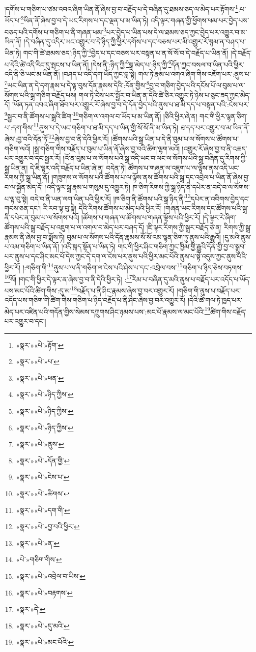 །དགོས་པ་གཅིག་པ་ཙམ་འབའ་ཞིག་ཡིན་ནོ་ཞེས་བྱ་བ་བརྗོད་པ་དེ་བཞིན་དུ་ཐམས་ཅད་ལ་མེད་པར་རྟོགས་\footnote{«སྣར་»«པེ་»རྟོག་}:པ་ཡོད་པ་\footnote{«སྣར་»«པེ་»པ་}ཡིན་ནོ་ཞེས་བྱ་བ་དེ་ཡང་རིགས་པ་དང་ལྡན་པ་མ་ཡིན་ཏེ། འདི་ལྟར་གཞན་གྱི་ཕྱོགས་ཕམ་པར་བྱེད་པས་བཅད་པའི་དགོས་པ་གཅིག་པ་ནི་གཞན་ཕམ་\footnote{«སྣར་»«པེ་»ཕན་}པར་བྱེད་པ་ཡིན་པས་དེ་ལ་ཐམས་ཅད་ཀྱང་བྱེད་པར་འགྱུར་བ་མ་ཡིན་ནོ། །དེ་བཞིན་དུ་འདིར་ཡང་འགྱུར་བ་དེ་ཉིད་ཀྱི་ཕྱིར་དགོས་པ་དང་བཅས་པར་མི་འགྱུར་རོ་སྙམ་ན་བཤད་པ་ཡིན་ཏེ། གང་གི་ཚེ་ཐམས་ཅད་:ཉིད་ཀྱི་\footnote{«སྣར་»«པེ་»ཉིད་ཀྱིས་}བྱེད་པ་དང་བཅས་པར་བསྟན་པ་ན་སོ་སོ་བ་དེ་བརྗོད་པ་ཡིན་ནོ། །དེ་བརྗོད་པ་དེའི་ཚེ་འདི་རིང་དུ་སྤངས་པ་ཡིན་ནོ། །དེས་ནི་:ཉིད་ཀྱི་\footnote{«སྣར་»«པེ་»ཉིད་ཀྱིས་}སྒྲ་མེད་པ་:ཉིད་ཀྱི་\footnote{«སྣར་»«པེ་»ཉིད་ཀྱིས་}དོན་ཀྱང་བསལ་བ་ཡིན་པའི་ཕྱིར་འདི་ནི་ཅི་ཡང་མ་ཡིན་ནོ། །བཤད་པ་འདི་དག་ཡོད་ཀྱང་བླ་སྟེ། གལ་ཏེ་རྣམ་པ་འགའ་ཞིག་གིས་འཇོག་པར་:ནུས་པ་\footnote{«སྣར་»«པེ་»ནུས་}ཡང་ཡིན་ན་དེ་དག་རྣམ་པ་དེ་ལྟ་བུས་དོན་རྣམས་དེའི་:དོན་གྱིས་\footnote{«སྣར་»«པེ་»དོན་གྱི་}བྱ་བ་གཅིག་བྱེད་པའི་དངོས་པོ་ལ་བུམ་པ་ལ་སོགས་པའི་སྒྲ་གཅིག་བརྗོད་པས། གལ་ཏེ་ངེས་པར་སྦྱོར་བ་ཡིན་ན་དེའི་ཚེ་ཅིར་འགྱུར་ཏེ་ཉེས་པ་ཅུང་ཟད་ཀྱང་མེད་དོ། །ཡོན་ཏན་འབའ་ཞིག་ཐོབ་པར་འགྱུར་རོ་ཞེས་བྱ་བ་དེ་དོན་བྱེད་པའི་ནུས་པ་ཐ་མི་དད་པ་བསྟན་པའི་:ངེས་པར་\footnote{«སྣར་»«པེ་»ངེས་པ་}སྦྱར་བ་ནི་ཚོགས་པ་སྒྲའི་ཚིག་\footnote{«སྣར་»«པེ་»ཚིགས་}གཅིག་ལ་འགལ་བ་ཡོད་པ་མ་ཡིན་ནོ། །ཅིའི་ཕྱིར་ཞེ་ན། གང་གི་ཕྱིར་ལྷན་ཅིག་པ་:དག་གིས་\footnote{«སྣར་»«པེ་»དག་གི་}ནུས་པ་དེ་ཡང་གཅིག་པ་ཐ་མི་དད་པ་ཡིན་གྱི་སོ་སོ་ནི་མ་ཡིན་ཏེ། ཐ་དད་པར་འགྱུར་བ་མ་ཡིན་ནོ་ཞེས་:བྱ་བའི་དོན་ཏོ་\footnote{«སྣར་»«པེ་»བྱ་བའི་ཕྱིར་}ཞེས་བྱ་བ་ནི་དེའི་ཕྱིར་རོ། །ཚོགས་པའི་སྒྲ་ཡིན་པ་དེ་ནི་བུམ་པ་ལ་སོགས་པ་ཚོགས་པ་གཅིག་ལའོ། །སྒྲ་གཅིག་གིས་བརྗོད་པ་བུམ་པ་ཡིན་ནོ་ཞེས་བྱ་བའི་ཚིག་ལྷག་མའོ། །འགྱུར་རོ་ཞེས་བྱ་བ་ནི་འཆད་པར་འགྱུར་བ་དང་སྦྱར་རོ། །འོ་ན་བུམ་པ་ལ་སོགས་པའི་སྒྲ་འདི་ཡང་བ་ལང་ལ་སོགས་པའི་སྒྲ་བཞིན་དུ་རིགས་ཀྱི་སྒྲ་ཡིན་ན། དེ་ཇི་ལྟར་འདི་བརྗོད་པ་ཡིན་ཞེ་ན། བདེན་ཏེ། ཚོགས་པ་གཞན་ལ་འཇུག་པ་ལ་ལྟོས་ནས་འདི་ཡང་རིགས་ཀྱི་སྒྲ་ཡིན་ནོ། །གཟུགས་ལ་སོགས་པའི་ཚོགས་པ་ལ་ལྟོས་ནས་ཚོགས་པའི་སྒྲ་དང་འབྲེལ་པ་ཡིན་ནོ་ཞེས་བྱ་བ་ལ་སྐྱོན་མེད་དོ། །འདི་ལྟར་སྒྲ་རྣམ་པ་གསུམ་དུ་འགྱུར་ཏེ། ཁ་ཅིག་རིགས་ཀྱི་སྒྲ་ཉིད་ནི་དཔེར་ན་བདེ་བ་ལ་སོགས་པ་ལྟ་བུ་སྟེ། བདེ་བ་ནི་ཡན་ལག་ཡིན་པའི་ཕྱིར་རོ། །ཁ་ཅིག་ནི་ཚོགས་པའི་སྒྲ་ཉིད་ནི་\footnote{«སྣར་»«པེ་»ན་}དཔེར་ན་འབིགས་བྱེད་དང་གངས་ཅན་དང་། རི་རབ་ལྟ་བུ་སྟེ། དེའི་རིགས་ཚོགས་པ་མེད་པའི་ཕྱིར་རོ། །གཞན་ཡང་རིགས་དང་ཚོགས་པའི་སྒྲ་ནི་དཔེར་ན་བུམ་པ་ལ་སོགས་པའོ། །ཚོགས་པ་གཞན་ལ་ཚོགས་པ་གཞན་ལྟོས་པའི་ཕྱིར་རོ། །དེ་ལྟར་རེ་ཞིག་ཚོགས་པའི་སྒྲ་བརྗོད་པ་འཇུག་པ་ལ་འགལ་བ་མེད་པར་བཤད་དོ། །ཇི་ལྟར་རིགས་ཀྱི་སྒྲར་བརྗོད་ཅེ་ན། རིགས་ཀྱི་སྒྲ་རྣམས་ནི་ཞེས་བྱ་བ་སྨོས་ཏེ། བུམ་པ་ལ་སོགས་པའི་དོན་རྣམས་སོ་སོ་འམ་ལྷན་ཅིག་ཏུ་ནུས་པའི་རྒྱུའོ། །དུ་མའི་ནུས་པ་འམ་གཅིག་པ་ཡིན་ནོ། །འདི་སྐད་སྟོན་པ་ཡིན་ཏེ། གང་གི་ཕྱིར་ཤིང་གཅིག་ཀྱང་ཁྱིམ་གྱི་རྒྱུའི་དོན་གྱི་བྱ་བ་སྒྲུབ་པར་ནུས་པ་དང་ཤིང་མང་པོ་དེས་ཀྱང་དེ་དག་ལ་ངེས་པར་ནུས་པའི་ཕྱིར་མང་པོའི་ནུས་པ་སྟེ་འདུས་ཀྱང་ནུས་པའི་ཕྱིར་རོ། །:གཅིག་གི་\footnote{«པེ་»གཅིག་གིས་}ནུས་པ་ལ་ནི་གཅིག་ལ་ངེས་པའི་ཤེས་པ་དང་:འབྲེལ་བས་\footnote{«སྣར་»«པེ་»འབྲེལ་བ་ཡིས་}གཅིག་པ་ཉིད་ཅེས་བཏགས་\footnote{«སྣར་»«པེ་»བརྟགས་}སོ། །གང་གི་ཕྱིར་དེ་ལྟར་ན་ཞེས་བྱ་བ་ནི་དེའི་ཕྱིར་ཏེ། :\footnote{«སྣར་»དེ་}རིམ་པ་བཞིན་དུ་མའི་ནུས་པ་བརྗོད་པར་འདོད་པ་ཡོད་པས་མང་པོའི་ཚིག་གིས་:དུ་མ་\footnote{«སྣར་»«པེ་»དུ་མའི་}བརྗོད་པ་ནི་ཤིང་རྣམས་ཞེས་བྱ་བར་འགྱུར་རོ། །གཅིག་གི་ནུས་པ་བརྗོད་པར་འདོད་པས་གཅིག་གི་ཚིག་གིས་གཅིག་པ་ཉིད་བརྗོད་པ་ནི་ཤིང་ཞེས་བྱ་བར་འགྱུར་རོ། །དེའི་ཚེ་གལ་ཏེ་ཁྱད་པར་མེད་པར་འཛིན་པའི་གདོན་གྱིས་སེམས་དཀྲུགས་ཤིང་ཉམས་པས་:མང་པོ་རྣམས་ལ་མང་པོའི་\footnote{«སྣར་»«པེ་»མང་པོའི་}ཚིག་གིས་བརྗོད་པར་འགྱུར་བ་དང་། 